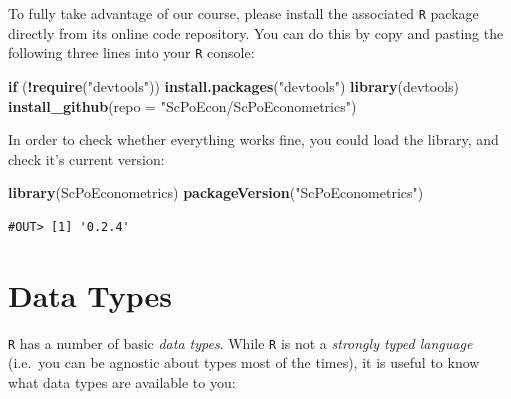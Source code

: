 \documentclass[]{book}
\newenvironment{Shaded}{\begin{snugshade}}{\end{snugshade}}
\newcommand{\ControlFlowTok}[1]{\textcolor[rgb]{0.13,0.29,0.53}{\textbf{#1}}}
\newcommand{\DataTypeTok}[1]{\textcolor[rgb]{0.13,0.29,0.53}{#1}}
\newcommand{\KeywordTok}[1]{\textcolor[rgb]{0.13,0.29,0.53}{\textbf{#1}}}
\newcommand{\NormalTok}[1]{#1}
\newcommand{\OperatorTok}[1]{\textcolor[rgb]{0.81,0.36,0.00}{\textbf{#1}}}
\newcommand{\StringTok}[1]{\textcolor[rgb]{0.31,0.60,0.02}{#1}}
\begin{document}
To fully take advantage of our course, please install the associated \texttt{R} package directly from its online code repository. You can do this by copy and pasting the following three lines into your \texttt{R} console:

\begin{Shaded}
\begin{Highlighting}[]
\ControlFlowTok{if}\NormalTok{ (}\OperatorTok{!}\KeywordTok{require}\NormalTok{(}\StringTok{"devtools"}\NormalTok{)) }\KeywordTok{install.packages}\NormalTok{(}\StringTok{"devtools"}\NormalTok{)}
\KeywordTok{library}\NormalTok{(devtools)}
\KeywordTok{install_github}\NormalTok{(}\DataTypeTok{repo =} \StringTok{"ScPoEcon/ScPoEconometrics"}\NormalTok{)}
\end{Highlighting}
\end{Shaded}

In order to check whether everything works fine, you could load the library, and check it's current version:

\begin{Shaded}
\begin{Highlighting}[]
\KeywordTok{library}\NormalTok{(ScPoEconometrics)}
\KeywordTok{packageVersion}\NormalTok{(}\StringTok{"ScPoEconometrics"}\NormalTok{)}
\end{Highlighting}
\end{Shaded}

\begin{verbatim}
#OUT> [1] '0.2.4'
\end{verbatim}

\hypertarget{data-types}{%
\section{Data Types}\label{data-types}}

\texttt{R} has a number of basic \emph{data types}. While \texttt{R} is not a \emph{strongly typed language} (i.e.~you can be agnostic about types most of the times), it is useful to know what data types are available to you:
\end{document}
